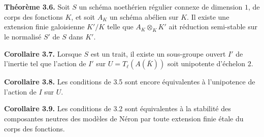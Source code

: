 \documentclass[11pt]{article}
\begin{document}
\textbf{Théorème 3.6.} Soit \(S\) un schéma noethérien régulier connexe de dimension \(1\), de corps des fonctions \(K\), et soit \(A_K\) un schéma abélien sur \(K\).  Il existe une extension finie galoisienne \(K'/K\) telle que \(A_K\otimes_KK'\) ait réduction semi-stable sur le normalisé \(S'\) de \(S\) dans \(K'\).

\textbf{Corollaire 3.7.} Lorsque \(S\) est un trait, il existe un sous-groupe ouvert \(I'\) de l'inertie tel que l'action de \(I'\) sur \(U=T_\ell(A(\bar K))\) soit unipotente d'échelon \(2\).

\textbf{Corollaire 3.8.} Les conditions de 3.5 sont encore équivalentes à l'unipotence de l'action de \(I\) sur \(U\).

\textbf{Corollaire 3.9.} Les conditions de 3.2 sont équivalentes à la stabilité des composantes neutres des modèles de Néron par toute extension finie étale du corps des fonctions.
\end{document}
